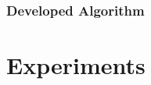 \documentclass[senior,final,11pt]{iscs-thesis}
\begin{document}
\subsection{Developed Algorithm}%





\chapter{Experiments}
\end{document}
